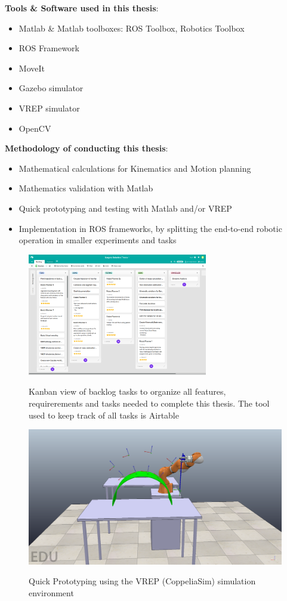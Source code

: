 \textbf{Tools \& Software used in this thesis}:
\begin{itemize}
\item Matlab \& Matlab toolboxes: ROS Toolbox, Robotics Toolbox
\item ROS Framework
\item MoveIt
\item Gazebo simulator
\item VREP simulator
\item OpenCV
\end{itemize}

\textbf{Methodology of conducting this thesis}:
\begin{itemize}
\item Mathematical calculations for Kinematics and Motion planning
\item Mathematics validation with Matlab
\item Quick prototyping and testing with Matlab and/or VREP
\item Implementation in ROS frameworks, by splitting the end-to-end robotic operation in smaller 
experiments and tasks
\end{itemize}

\begin{center}
\begin{figure}[H]
\centering
\includegraphics[width=0.7\textwidth]{images/task-backlog-airtable.png}\\
\caption{Kanban view of backlog tasks to organize all features, requirerements and tasks needed to complete this thesis. The tool used to keep track of all tasks is Airtable}
\end{figure}
\end{center}

\begin{center}
\begin{figure}[H]
\centering
\includegraphics[width=\textwidth]{images/quick-vrep-prototyping.png}\\
\caption{Quick Prototyping using the VREP (CoppeliaSim) simulation environment}
\end{figure}
\end{center}